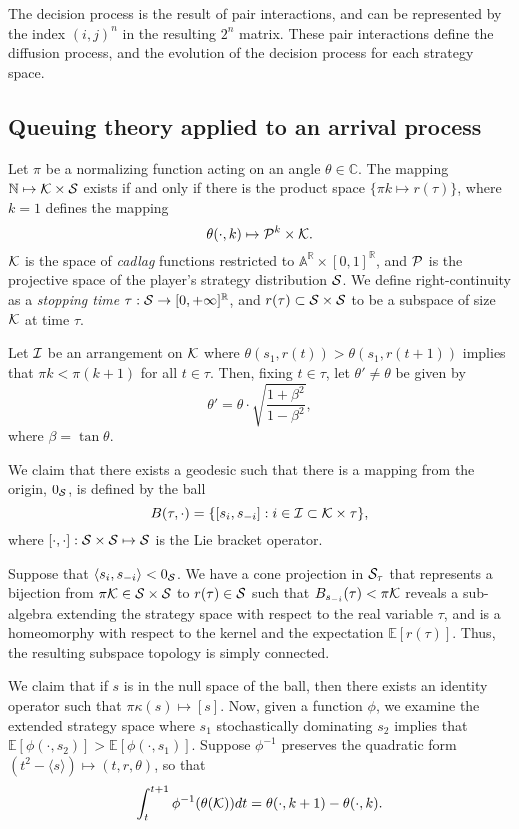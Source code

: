 The decision process is the result of pair interactions,
and can be represented by the index $(i,j)^n$ in the
resulting $2^n$ matrix. These pair interactions define the diffusion process,
and the evolution of the decision process for each strategy space.

\subsection{Queuing theory applied to an arrival process}

Let $\pi$ be a normalizing function acting on an angle $\theta \in \mathbb{C}$.
The mapping $\mathbb{N} \mapsto \mathcal{K}\times \mathcal{S}$ exists if and only if there is
the product space $\lbrace \pi k \mapsto r(\tau)\rbrace$, where $k=1$ defines
the mapping 
$$
    \theta(\cdot, k) \mapsto \mathcal{P}^k \times \mathcal{K}.
$$
$\mathcal{K}$ is the space of \emph{cadlag} functions restricted to
$\mathbb{A}^\mathbb{R} \times [0,1]^\mathbb{R}$,
and $\mathcal{P}$ is the projective space of the
player's strategy distribution $\mathcal{S}$. We define right-continuity as 
a \emph{stopping time} $\tau:\mathcal{S} \rightarrow [0,+\infty]^\mathbb{R}$, and
$r(\tau) \subset \mathcal{S} \times \mathcal{S}$ to be a subspace of size $\mathcal{K}$ at time $\tau$.

Let $\mathcal{I}$ be an arrangement on $\mathcal{K}$ where
$\theta (s_1, r(t)) > \theta (s_1, r(t+1))$ implies that $\pi k < \pi
(k+1)$ for all $t\in\tau$.
Then, fixing $t\in \tau$, let $\theta' \ne \theta$ be given by 
$$
    \theta' = \theta \cdot \displaystyle\sqrt{\frac{1+\beta^2}{1-\beta^2}},
$$
where $\beta = \tan\theta$. 

We claim that there exists a geodesic such that there is a
mapping from the origin, $0_{\mathcal{S}}$, is defined by the ball
$$
    B(\tau, \cdot) = \lbrace \lbrack s_i, s_{-i}\rbrack : i \in \mathcal{I} \subset
    \mathcal{K}\times \tau \rbrace,
$$
where $\lbrack \cdot, \cdot\rbrack : \mathcal{S} \times \mathcal{S} \mapsto \mathcal{S}$ is the Lie
bracket operator.

Suppose that $\langle s_i, s_{-i}\rangle < 0_{\mathcal{S}}$. We have a cone projection in
$\mathcal{S}_\tau$ that represents a bijection from $\pi\mathcal{K} \in \mathcal{S} \times \mathcal{S}$ to $r(\tau) \in \mathcal{S}$
such that
$B_{s_{-i}}(\tau) < \pi\mathcal{K}$ reveals a sub-algebra extending the strategy space
with respect to the real variable $\tau$, and is a homeomorphy with respect to
the kernel and the expectation $\mathbb{E}[r(\tau)]$. %
Thus, the resulting subspace topology is simply connected.

We claim that if $s$ is in the null space of the ball, then there exists an identity
operator such that $\pi\kappa(s) \mapsto [s]$.
Now, given a function $\phi$, we examine the
extended strategy space where $s_1$ stochastically dominating $s_2$ implies that
$\mathbb{E}[\phi (\cdot, s_2 )] > \mathbb{E}[\phi (\cdot, s_1 )]$. Suppose
$\phi^{-1}$ preserves the quadratic form $(t^2- \langle s \rangle) \mapsto (t, r, \theta)$, so
that
$$
    \displaystyle \int_t^{t+1} \phi^{-1}(\theta(\mathcal{K})) dt = \theta(\cdot,
    k+1)-\theta(\cdot,k).
$$

